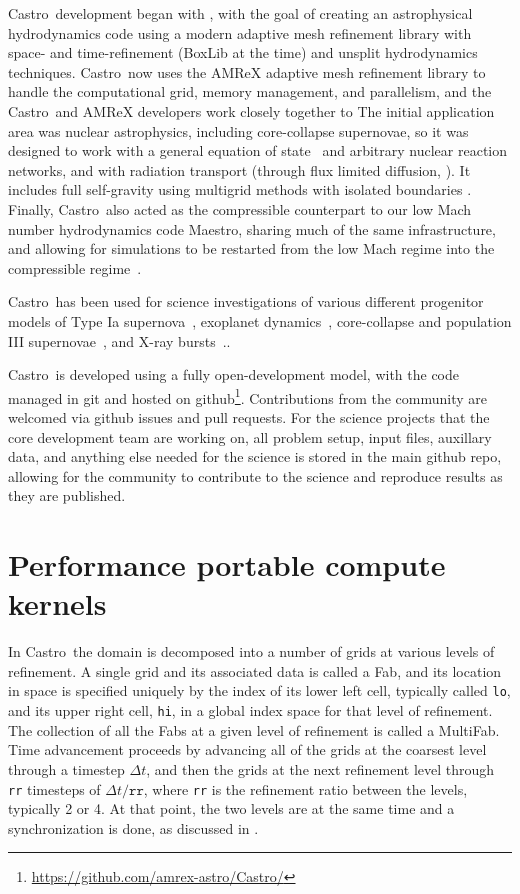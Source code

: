 \documentclass[twocolumn,times]{aastex62}
\newcommand{\castro}{{\sf Castro}}
\newcommand{\maestro}{{\sf Maestro}}
\newcommand{\fab}{{\sf Fab}}
\newcommand{\multifab}{{\sf MultiFab}}
\begin{document}
\castro\ development began with \cite{castro}, with the goal of
creating an astrophysical hydrodynamics code using a modern adaptive
mesh refinement library with space- and time-refinement (BoxLib at the
time) and unsplit hydrodynamics techniques.  \castro\ now uses the
AMReX adaptive mesh refinement library to handle the computational
grid, memory management, and parallelism, and the \castro\ and AMReX
developers work closely together to The initial application area was
nuclear astrophysics, including core-collapse supernovae, so it was
designed to work with a general equation of state~\cite{zingalekatz}
and arbitrary nuclear reaction networks, and with radiation transport
(through flux limited diffusion, \citealt{castro2,castro3}).  It
includes full self-gravity using multigrid methods with isolated
boundaries \citep{katz:2016}.  Finally, \castro\ also acted as the
compressible counterpart to our low Mach number hydrodynamics code
\maestro, sharing much of the same infrastructure, and allowing for
simulations to be restarted from the low Mach regime into the
compressible regime~\cite{malone:2014}.

\castro\ has been used for science investigations of various different
progenitor models of Type Ia
supernova~\cite{malone:2014,katz:2016,polin:2019}, exoplanet
dynamics~\cite{ryu:2018}, core-collapse and population III
supernovae~\cite{chen:2014,dolence:2015,chen:2017}, and X-ray
bursts~\cite{astronum:2018}..

\castro\ is developed using a fully open-development model, with the
code managed in git and hosted on
github\footnote{\url{https://github.com/amrex-astro/Castro/}}.
Contributions from the community are welcomed via github issues and
pull requests.  For the science projects that the core development
team are working on, all problem setup, input files, auxillary data,
and anything else needed for the science is stored in the main github
repo, allowing for the community to contribute to the science and
reproduce results as they are published.

\section{Performance portable compute kernels}

In \castro\ the domain is decomposed into a number of grids at various
levels of refinement.  A single grid and its associated data is called
a \fab, and its location in space is specified uniquely by the index
of its lower left cell, typically called {\tt lo}, and its upper right
cell, {\tt hi}, in a global index space for that level of refinement.
The collection of all the \fab s at a given level of refinement is
called a \multifab.  Time advancement proceeds by advancing all of the
grids at the coarsest level through a timestep $\Delta t$, and then
the grids at the next refinement level through {\tt rr} timesteps of
$\Delta t/\mathtt{rr}$, where {\tt rr} is the refinement ratio between
the levels, typically 2 or 4.  At that point, the two levels are at
the same time and a synchronization is done, as discussed in \cite{castro}.
\end{document}

